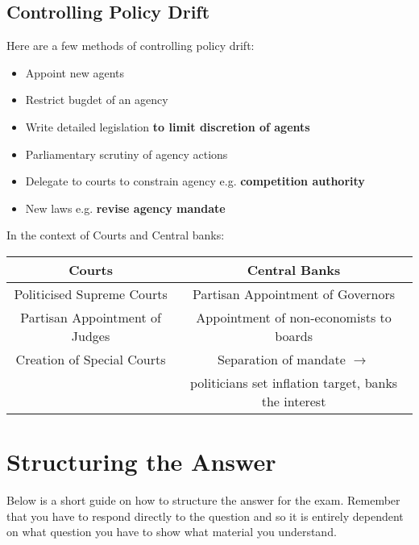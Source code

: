\documentclass[12pt, letterpaper]{article}
\begin{document}
\subsection{Controlling Policy Drift}
Here are a few methods of controlling policy drift:
\begin{itemize}
	\item Appoint new agents
	\item Restrict bugdet of an agency
	\item Write detailed legislation \textbf{to limit discretion of agents}
	\item Parliamentary scrutiny of agency actions
	\item Delegate to courts to constrain agency e.g. \textbf{competition authority}
	\item New laws e.g. \textbf{revise agency mandate}
\end{itemize}
In the context of Courts and Central banks:
\begin{center}
\begin{adjustbox}{width=.85\textwidth}
\begin{tabular}{c|c}

Courts & Central Banks\\
\hline
Politicised Supreme Courts & Partisan Appointment of Governors\\
Partisan Appointment of Judges & Appointment of non-economists to boards\\
Creation of Special Courts & Separation of mandate $\rightarrow$\\ 
& politicians set inflation target, banks the interest\\
\hline

\end{tabular}
\end{adjustbox}
\end{center}

\newpage
\section{Structuring the Answer}
Below is a short guide on how to structure the answer for the exam. Remember that you have to respond directly to the question and so it is entirely dependent on what question you have to show what material you understand. 
\end{document}
